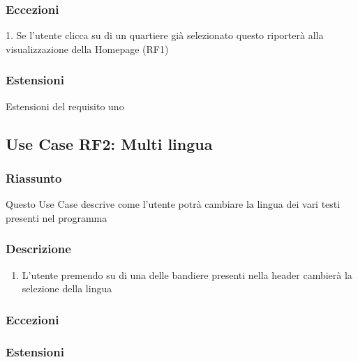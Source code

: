         \subsubsection{Eccezioni}
            1. Se l'utente clicca su di un quartiere già selezionato questo riporterà alla visualizzazione della Homepage (RF1)
        \subsubsection{Estensioni}
            Estensioni del requisito uno    %
    \subsection{Use Case {RF2}: Multi lingua}
        \subsubsection{Riassunto}
            Questo Use Case descrive come l'utente potrà cambiare la lingua dei vari testi presenti nel programma
        \subsubsection{Descrizione}
            \begin{enumerate}
            \item L'utente premendo su di una delle bandiere presenti nella header cambierà la selezione della lingua
            \end{enumerate}
        \subsubsection{Eccezioni}
        \subsubsection{Estensioni}
